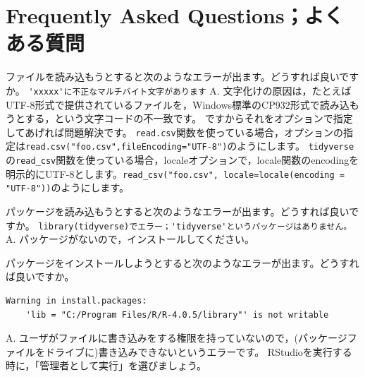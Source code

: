 \documentclass{ltjsbook}
\begin{document}
 
\VerbatimFootnotes
\chapter{Frequently Asked Questions；よくある質問}

\begin{FAQ}{ファイルを読み込もうとすると次のようなエラーが出ます。どうすれば良いですか。}{}
    \verb|'xxxxx'に不正なマルチバイト文字があります|
    \tcblower
    {\large A.} 文字化けの原因は，たとえばUTF-8形式で提供されているファイルを，Windows標準のCP932形式で読み込もうとする，という文字コードの不一致です。
    ですからそれをオプションで指定してあげれば問題解決です。
    \verb|read.csv|関数を使っている場合，オプションの指定は\verb|read.csv("foo.csv",fileEncoding="UTF-8")|のようにします。
    \verb|tidyverse|の\verb|read_csv|関数を使っている場合，localeオプションで，locale関数のencodingを明示的にUTF-8とします。\verb|read_csv("foo.csv", locale=locale(encoding = "UTF-8"))|のようにします。
\end{FAQ}

\begin{FAQ}{パッケージを読み込もうとすると次のようなエラーが出ます。どうすれば良いですか。}{}
    \verb|library(tidyverse)でエラー；'tidyverse'というパッケージはありません。|
    \tcblower
    {\large A.} パッケージがないので，インストールしてください。
\end{FAQ}


\begin{FAQ}{パッケージをインストールしようとすると次のようなエラーが出ます。どうすれば良いですか。}{}
\begin{verbatim}
Warning in install.packages:
    'lib = "C:/Program Files/R/R-4.0.5/library"' is not writable
\end{verbatim}
\tcblower
{\large A.} ユーザがファイルに書き込みをする権限を持っていないので，(パッケージファイルをドライブに)書き込みできないというエラーです。
RStudioを実行する時に，「管理者として実行」を選びましょう。
\end{FAQ}
\end{document}
